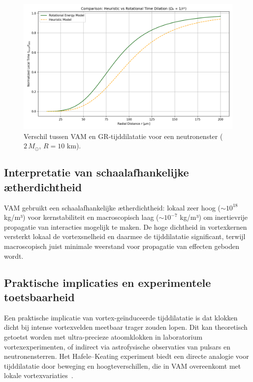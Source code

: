 \begin{figure}[ht!]
    \centering
    \includegraphics[width=0.7\linewidth]{RotationalVsHeuristicTimeDilation}
    \caption{Verschil tussen VAM en GR-tijddilatatie voor een neutronenster ($2\,M_\odot$, $R=10$ km).}
    \label{fig:vergelijkingVAMGR}
\end{figure}

\subsection{Interpretatie van schaalafhankelijke ætherdichtheid}

VAM gebruikt een schaalafhankelijke ætherdichtheid: lokaal zeer hoog ($\sim10^{18}$ kg/m³) voor kernstabiliteit en macroscopisch laag ($\sim10^{-7}$ kg/m³) om inertievrije propagatie van interacties mogelijk te maken. De hoge dichtheid in vortexkernen versterkt lokaal de vortexsnelheid en daarmee de tijddilatatie significant, terwijl macroscopisch juist minimale weerstand voor propagatie van effecten geboden wordt.

\subsection{Praktische implicaties en experimentele toetsbaarheid}

Een praktische implicatie van vortex-geïnduceerde tijddilatatie is dat klokken dicht bij intense vortexvelden meetbaar trager zouden lopen. Dit kan theoretisch getoetst worden met ultra-precieze atoomklokken in laboratorium vortexexperimenten, of indirect via astrofysische observaties van pulsars en neutronensterren. Het Hafele–Keating experiment biedt een directe analogie voor tijddilatatie door beweging en hoogteverschillen, die in VAM overeenkomt met lokale vortexvariaties~\cite{hafele1972around}.
